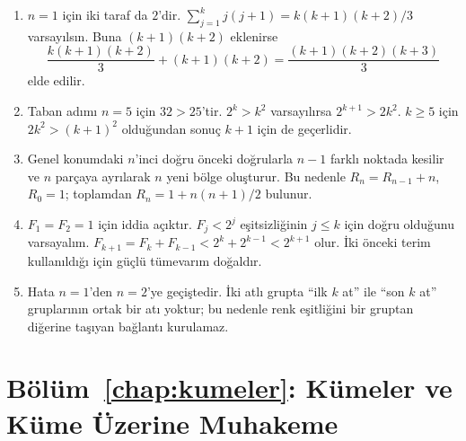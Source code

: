 \begin{enumerate}
\item $n=1$ için iki taraf da $2$'dir. $\sum_{j=1}^{k}j(j+1)=k(k+1)(k+2)/3$ varsayılsın. Buna $(k+1)(k+2)$ eklenirse
\[
\frac{k(k+1)(k+2)}{3}+(k+1)(k+2)
=\frac{(k+1)(k+2)(k+3)}{3}
\]
elde edilir.

\item Taban adımı $n=5$ için $32>25$'tir. $2^k>k^2$ varsayılırsa $2^{k+1}>2k^2$. $k\geq5$ için $2k^2>(k+1)^2$ olduğundan sonuç $k+1$ için de geçerlidir.

\item Genel konumdaki $n$'inci doğru önceki doğrularla $n-1$ farklı noktada kesilir ve $n$ parçaya ayrılarak $n$ yeni bölge oluşturur. Bu nedenle $R_n=R_{n-1}+n$, $R_0=1$; toplamdan $R_n=1+n(n+1)/2$ bulunur.

\item $F_1=F_2=1$ için iddia açıktır. $F_j<2^j$ eşitsizliğinin $j\leq k$ için doğru olduğunu varsayalım. $F_{k+1}=F_k+F_{k-1}<2^k+2^{k-1}<2^{k+1}$ olur. İki önceki terim kullanıldığı için güçlü tümevarım doğaldır.

\item Hata $n=1$'den $n=2$'ye geçiştedir. İki atlı grupta ``ilk $k$ at'' ile ``son $k$ at'' gruplarının ortak bir atı yoktur; bu nedenle renk eşitliğini bir gruptan diğerine taşıyan bağlantı kurulamaz.
\end{enumerate}

\section{Bölüm~\ref{chap:kumeler}: Kümeler ve Küme Üzerine Muhakeme}

